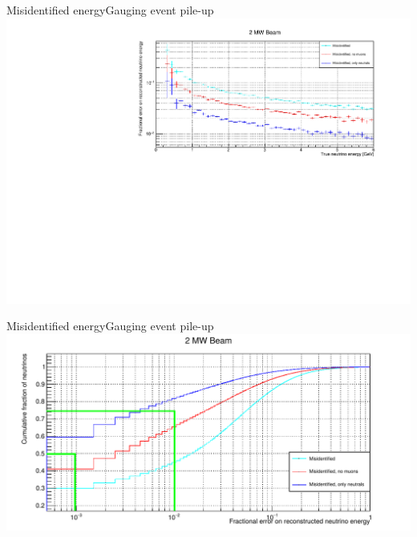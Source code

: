 \documentclass[]{beamer}
\begin{document}
\begin{frame}{Misidentified energy}{Gauging event pile-up}
	\centering
	\includegraphics[width=\textwidth]{pile-up/2MW/misid_rel_x}
\end{frame}

\begin{frame}{Misidentified energy}{Gauging event pile-up}
	\centering
	\includegraphics[width=\textwidth]{defence/misid_rel_y}
\end{frame}
\end{document}
